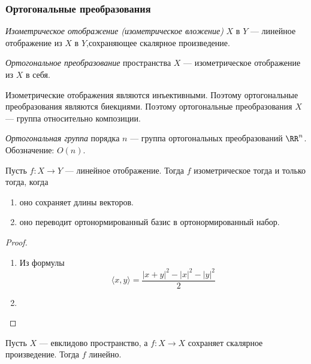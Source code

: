 \documentclass[12pt,a4paper]{article}
\begin{document}
    \subsubsection{Ортогональные преобразования}

    \begin{definition}
        \emph{Изометрическое отображение (изометрическое вложение)} $X$ в $Y$ --- линейное отображение из $X$ в $Y$,сохраняющее скалярное произведение.
        
        \emph{Ортогональное преобразование} пространства $X$ --- изометрическое отображение из $X$ в себя.
    \end{definition}

    \begin{remark}
        Изометрические отображения являются инъективными. Поэтому ортогональные преобразования являются биекциями. Поэтому ортогональные преобразования $X$ --- группа относительно композиции.
    \end{remark}

    \begin{definition}
        \emph{Ортогональная группа} порядка $n$ --- группа ортогональных преобразований $\RR^n$. Обозначение: $O(n)$.
    \end{definition}

    \begin{lemma}
        Пусть $f: X \to Y$ --- линейное отображение. Тогда $f$ изометрическое тогда и только тогда, когда
        \begin{enumerate}
            \item оно сохраняет длины векторов.
            \item оно переводит ортонормированный базис в ортонормированный набор.
        \end{enumerate}
    \end{lemma}

    \begin{proof}
        \begin{enumerate}
            \item Из формулы
                \[\langle x, y \rangle = \frac{|x+y|^2 - |x|^2 - |y|^2}{2}\]
            \item {}
        \end{enumerate}
    \end{proof}

    \begin{lemma}
        Пусть $X$ --- евклидово пространство, а $f: X \to X$ сохраняет скалярное произведение. Тогда $f$ линейно. 
    \end{lemma}
\end{document}
